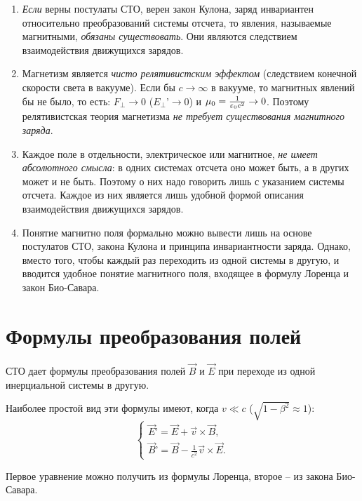 	\begin{enumerate}
        \item \textit{Если} верны постулаты СТО, верен закон Кулона, заряд
            инвариантен относительно преобразований системы отсчета, то явления,
            называемые магнитными, \textit{обязаны существовать}. Они являются
            следствием взаимодействия движущихся зарядов.
        
        \item Магнетизм является \textit{чисто релятивистским эффектом}
            (следствием конечной скорости света в вакууме). Если бы
            \( c\to\infty \) в вакууме, то магнитных явлений бы не было, то
            есть: \( F_\perp \to 0 \) (\( E_\perp{’} \to 0 \)) и
            \( \mu_0 = \frac{1}{\varepsilon_0 c^2} \to 0 \). Поэтому релятивистская
            теория магнетизма \textit{не требует существования магнитного
            заряда}.
        
        \item Каждое поле в отдельности, электрическое или магнитное, \textit{не
            имеет абсолютного смысла}: в одних системах отсчета оно может быть,
            а в других может и не быть. Поэтому о них надо говорить лишь с
            указанием системы отсчета. Каждое из них является лишь удобной
            формой описания взаимодействия движущихся зарядов.
        
        \item Понятие магнитно поля формально можно вывести лишь на основе
            постулатов СТО, закона Кулона и принципа инвариантности заряда.
            Однако, вместо того, чтобы каждый раз переходить из одной системы в
            другую, и вводится удобное понятие магнитного поля, входящее в
            формулу Лоренца и закон Био-Савара.
	\end{enumerate}

\section{Формулы преобразования полей}

	СТО дает формулы преобразования полей \( \vec{B} \) и \( \vec{E} \) при
    переходе из одной инерциальной системы в другую.
	
	Наиболее простой вид эти формулы имеют, когда \( v \ll c \) (\( \sqrt{1 - \beta^2} \approx 1 \)):
	\[
        \left\{
        \begin{array}{l}
            \vec{E}{’} = \vec{E} + \vec{v}\times\vec{B}, \\
            \vec{B}{’} = \vec{B} - \frac{1}{c^2} \vec{v}\times\vec{E}.
        \end{array}
        \right.
    \]
	
	Первое уравнение можно получить из формулы Лоренца, второе -- из закона
    Био-Савара.
